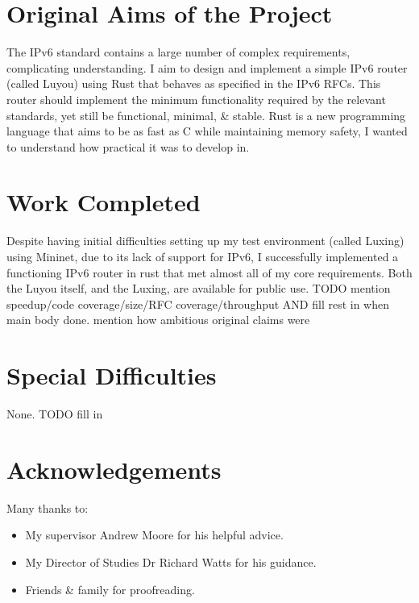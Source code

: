 \documentclass[12pt,a4paper,twoside,openright]{report}
\begin{document}
\section*{Original Aims of the Project}

The IPv6 standard contains a large number of complex requirements, complicating understanding. I aim to design and implement a simple IPv6 router (called Luyou) using Rust\cite{rust} that behaves as specified in the IPv6 RFCs\cite{ipv6_rfc}. This router should implement the minimum functionality required by the relevant standards, yet still be functional, minimal, \& stable.  Rust is a new programming language that aims to be as fast as C while maintaining memory safety, I wanted to understand how practical it was to develop in.

\section*{Work Completed}

Despite having initial difficulties setting up my test environment (called Luxing) using Mininet\cite{mininet}, due to its lack of support for IPv6, I successfully implemented a functioning IPv6 router in rust that met almost all of my core requirements. Both the Luyou itself, and the Luxing, are available for public use.  TODO mention speedup/code coverage/size/RFC coverage/throughput AND fill rest in when main body done. mention how ambitious original claims were

\section*{Special Difficulties}

None. TODO fill in

\tableofcontents
{}
\listoffigures
{}

\newpage
\section*{Acknowledgements}

Many thanks to:
\begin{itemize}
\item My supervisor Andrew Moore for his helpful advice.
\item My Director of Studies Dr Richard Watts for his guidance.
\item Friends \& family for proofreading.
\end{itemize}
\end{document}
